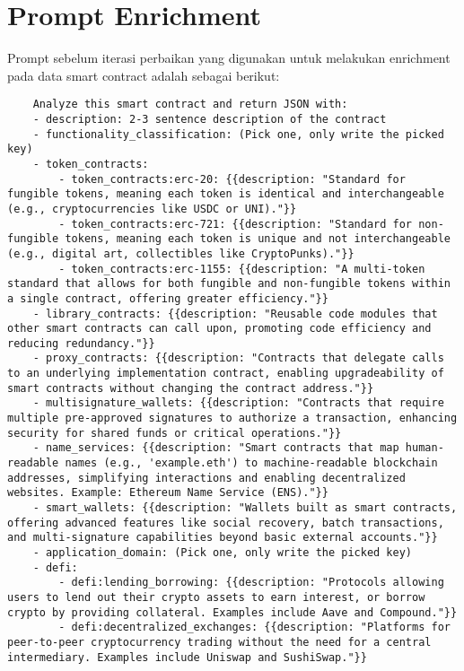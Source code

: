 \chapter{Prompt Enrichment}
\label{appendix:prompt-enrichment}

Prompt sebelum iterasi perbaikan yang digunakan untuk melakukan enrichment pada data smart contract adalah sebagai berikut:

\begin{lstlisting}
    Analyze this smart contract and return JSON with:
    - description: 2-3 sentence description of the contract
    - functionality_classification: (Pick one, only write the picked key)
    - token_contracts:
        - token_contracts:erc-20: {{description: "Standard for fungible tokens, meaning each token is identical and interchangeable (e.g., cryptocurrencies like USDC or UNI)."}}
        - token_contracts:erc-721: {{description: "Standard for non-fungible tokens, meaning each token is unique and not interchangeable (e.g., digital art, collectibles like CryptoPunks)."}}
        - token_contracts:erc-1155: {{description: "A multi-token standard that allows for both fungible and non-fungible tokens within a single contract, offering greater efficiency."}}
    - library_contracts: {{description: "Reusable code modules that other smart contracts can call upon, promoting code efficiency and reducing redundancy."}}
    - proxy_contracts: {{description: "Contracts that delegate calls to an underlying implementation contract, enabling upgradeability of smart contracts without changing the contract address."}}
    - multisignature_wallets: {{description: "Contracts that require multiple pre-approved signatures to authorize a transaction, enhancing security for shared funds or critical operations."}}
    - name_services: {{description: "Smart contracts that map human-readable names (e.g., 'example.eth') to machine-readable blockchain addresses, simplifying interactions and enabling decentralized websites. Example: Ethereum Name Service (ENS)."}}
    - smart_wallets: {{description: "Wallets built as smart contracts, offering advanced features like social recovery, batch transactions, and multi-signature capabilities beyond basic external accounts."}}
    - application_domain: (Pick one, only write the picked key)
    - defi:
        - defi:lending_borrowing: {{description: "Protocols allowing users to lend out their crypto assets to earn interest, or borrow crypto by providing collateral. Examples include Aave and Compound."}}
        - defi:decentralized_exchanges: {{description: "Platforms for peer-to-peer cryptocurrency trading without the need for a central intermediary. Examples include Uniswap and SushiSwap."}}

\end{lstlisting}
